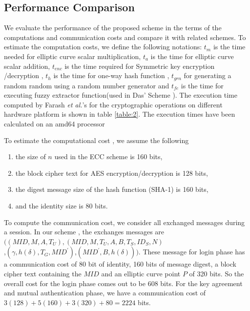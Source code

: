 \documentclass[a4paper,12pt]{report}
\begin{document}
\subsection{Performance Comparison}
We evaluate the performance of the proposed scheme in the terms of the computations and communication costs and compare it with related schemes. To estimate the computation costs, we define the following notations: $t_m$ is the time needed for elliptic curve scalar multiplication, $t_a$ is the time for elliptic curve scalar addition, $t_{enc}$ is the time required for Symmetric key encryption /decryption , $t_h$ is the time for one-way hash function , $t_{grn}$ for generating a random random using a random number generator and $t_{fe} $ is the time for executing fuzzy extractor function(used in Das' Scheme \cite{das2015secure}). The execution time computed by Farash \textit{et al.}'s\cite{farash2013} for the cryptographic operations on different hardware platform is shown in table \ref{table:2}. The execution times have been calculated on an amd64 processor

\begin{table}[h]
\centering
{}
\caption{The execution time of cryptographic operations}
\label{table:2}
\end{table}
To estimate the computational cost , we assume the following
\begin{enumerate}
\item the size of $n$ used in the ECC scheme is 160 bits,
\item the block cipher text for AES encryption/decryption is 128 bits,
\item the digest message size of the hash function (SHA-1) is 160 bits,
\item and the identity size is 80 bits.
\end{enumerate}
To compute the communication cost, we consider all exchanged
messages during a session. In our scheme , the exchanges messages
are $((MID, M,A,T_U),(MID,M,T_U,
A,B,T_S,ID_S,N)$\\,$(\gamma,h(\delta),T_G,MID^{\prime})$,$(MID^{\prime},B,h(\delta)))$.
These message for login phase has a communication cost of 80 bit of
identity, 160 bits of message digest, a block cipher text
containing the $MID$ and an elliptic curve point $P$ of 320 bits. So
the overall cost for the login phase comes out to be $608$ bits. For
the key agreement and mutual authentication phase, we have a
communication cost of $ 3(128) + 5(160) +3(320) + 80 = 2224$ bits.
\end{document}
